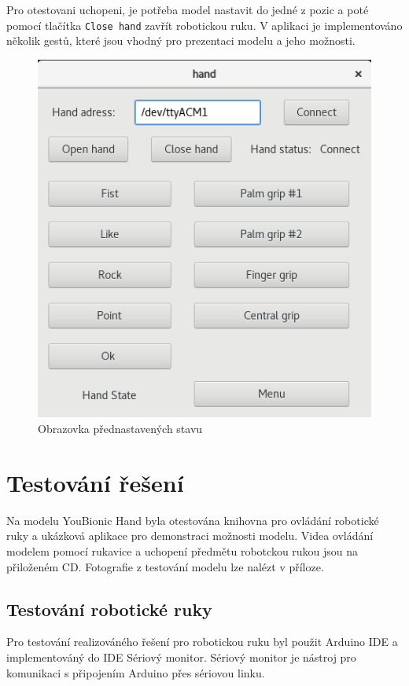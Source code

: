 \documentclass[thesis=B,czech]{FITthesis}[2012/06/26]
\begin{document}
Pro otestovani uchopeni, je potřeba model nastavit do jedné z pozic a poté pomocí tlačítka \texttt{Close hand} zavřít robotickou ruku. V aplikaci je implementováno několik gestů, které jsou vhodný pro prezentaci modelu a jeho možnosti.

 \begin{figure}[H]
\centering
\includegraphics[scale=0.5]{./image/AppScreen3.png}
\caption{Obrazovka přednastavených stavu}
\label{fig:AppScreen3}
\end{figure} 


\chapter{Testování řešení}
\label{ch:testSol}

Na modelu YouBionic Hand byla otestována knihovna pro ovládání robotické ruky a ukázková aplikace pro demonstraci možnosti modelu. Videa ovládání modelem pomocí rukavice a uchopení předmětu robotckou rukou jsou na přiloženém CD. Fotografie z testování modelu lze nalézt v příloze. 


\section{Testování robotické ruky}

Pro testování realizováného řešení pro robotickou ruku byl použit Arduino IDE a implementováný do IDE Sériový monitor. Sériový monitor je nástroj pro komunikaci s připojením Arduino přes sériovou linku.
\end{document}
